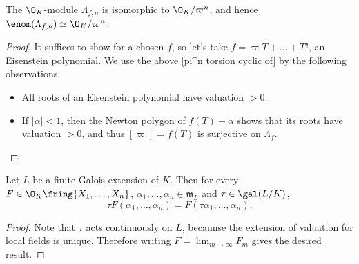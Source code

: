 \begin{proposition}
    The $\O_K$-module $\Lambda_{f, n}$ is isomorphic to $\O_K/\varpi^n$, and hence $\enom(\Lambda_{f, n})\simeq \O_K/\varpi^n$.
\end{proposition}
\begin{proof}
    It suffices to show for a chosen $f$, so let's take $f = \varpi T + \dots + T^q$, an Eisenstein polynomial.
    We use the above \cref{pi^n torsion cyclic of} by the following observations.\begin{itemize}
        \item All roots of an Eisenstein polynomial have valuation $>0$.
        \item If $|\alpha| < 1$, then the Newton polygon of $f(T) - \alpha$ shows that its roots have valuation $>0$, and thus $[\varpi] = f(T)$ is surjective on $\Lambda_f$.\qedhere
    \end{itemize}
\end{proof}

\begin{lemma}\label{galois commutes power series}
    Let $L$ be a finite Galois extension of $K$. Then for every $F\in\O_K\fring{X_1, \dots, X_n}$, $\alpha_1,\dots, \alpha_n\in\mathfrak{m}_L$ and $\tau\in\gal(L/K)$,
    \[\tau F(\alpha_1, \dots, \alpha_n) = F(\tau\alpha_1, \dots, \alpha_n).\]
\end{lemma}
\begin{proof}
    Note that $\tau$ acts continuously on $L$, becaunse the extension of valuation for local fields is unique.
    Therefore writing $F = \lim_{m\to\infty} F_m$ gives the desired result.
\end{proof}

